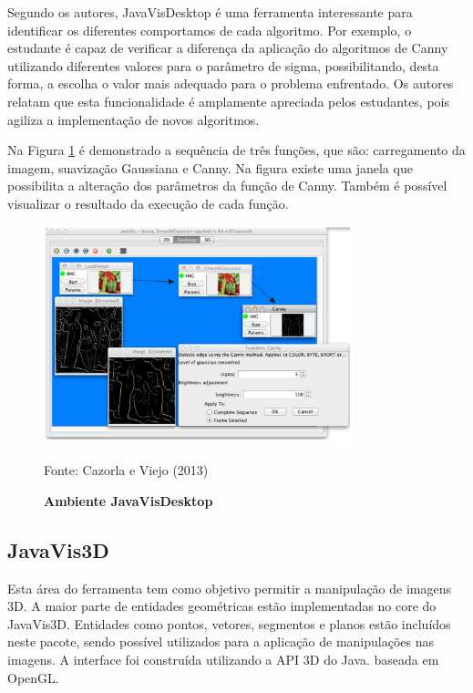 \documentclass[
	12pt,				%
	oneside,			%
	a4paper,			%
	english,			%
	french,				%
	spanish,			%
	brazil,				%
	]{abntex2}
\begin{document}
Segundo os autores, JavaVisDesktop é uma ferramenta interessante para identificar os diferentes comportamos de cada algoritmo. Por exemplo, o estudante é capaz de verificar a diferença da aplicação do algoritmos de Canny utilizando diferentes valores para o parâmetro de sigma, possibilitando, desta forma, a escolha o valor mais adequado para o problema enfrentado. Os autores relatam que esta funcionalidade é amplamente apreciada pelos estudantes, pois agiliza a implementação de novos algoritmos.

Na Figura \ref{fig:javavis_desktop} é demonstrado a sequência de três funções, que são: carregamento da imagem, suavização Gaussiana e Canny. Na figura existe uma janela que possibilita a alteração dos parâmetros da função de Canny. Também é possível visualizar o resultado da execução de cada função.

\begin{figure}[ht]
\centering
\caption{\textbf{Ambiente JavaVisDesktop}}
\includegraphics[width=0.8\textwidth]{imagens/javavis_desktop.png}

Fonte: Cazorla e Viejo  (2013)
\label{fig:javavis_desktop}
\end{figure}

\subsection{JavaVis3D}

Esta área do ferramenta tem como objetivo permitir a manipulação de imagens 3D. A maior parte de entidades geométricas estão implementadas no core do JavaVis3D. Entidades como pontos, vetores, segmentos e planos estão incluídos neste pacote, sendo possível utilizados para a aplicação de manipulações nas imagens. A interface foi construída utilizando a API 3D do Java. baseada em OpenGL.
\end{document}
